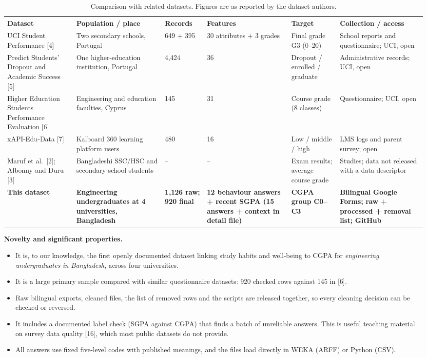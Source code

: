 \documentclass[11pt,a4paper]{article}
\newcommand{\hd}[1]{\textbf{#1}}
\begin{document}
\begin{table}[!htbp]
\centering\footnotesize
\caption{Comparison with related datasets. Figures are as reported by the dataset authors.}
\label{tab:compare}
\begin{tabularx}{\linewidth}{|L{30mm}|L{30mm}|R{12mm}|L{22mm}|Y|L{22mm}|}
\hline
{}\hd{Dataset} & \hd{Population / place} & \hd{Records} & \hd{Features} & \hd{Target} & \hd{Collection / access} \\ \hline
UCI Student Performance [4] & Two secondary schools, Portugal & 649 + 395 & 30 attributes + 3 grades & Final grade G3 (0--20) & School reports and questionnaire; UCI, open \\ \hline
Predict Students' Dropout and Academic Success [5] & One higher-education institution, Portugal & 4,424 & 36 & Dropout / enrolled / graduate & Administrative records; UCI, open \\ \hline
Higher Education Students Performance Evaluation [6] & Engineering and education faculties, Cyprus & 145 & 31 & Course grade (8 classes) & Questionnaire; UCI, open \\ \hline
xAPI-Edu-Data [7] & Kalboard 360 learning platform users & 480 & 16 & Low / middle / high & LMS logs and parent survey; open \\ \hline
Maruf et al.\ [2]; Albonny and Duru [3] & Bangladeshi SSC/HSC and secondary-school students & -- & -- & Exam results; average course grade & Studies; data not released with a data descriptor \\ \hline
\textbf{This dataset} & \textbf{Engineering undergraduates at 4 universities, Bangladesh} & \textbf{1,126 raw; 920 final} & \textbf{12 behaviour answers + recent SGPA (15 answers + context in detail file)} & \textbf{CGPA group C0--C3} & \textbf{Bilingual Google Forms; raw + processed + removal list; GitHub} \\ \hline
\end{tabularx}
\end{table}

\textbf{Novelty and significant properties.}
\begin{itemize}
\item It is, to our knowledge, the first openly documented dataset linking study habits and well-being to CGPA for \emph{engineering undergraduates in Bangladesh}, across four universities.
\item It is a large primary sample compared with similar questionnaire datasets: 920 checked rows against 145 in [6].
\item Raw bilingual exports, cleaned files, the list of removed rows and the scripts are released together, so every cleaning decision can be checked or reversed.
\item It includes a documented label check (SGPA against CGPA) that finds a batch of unreliable answers. This is useful teaching material on survey data quality [16], which most public datasets do not provide.
\item All answers use fixed five-level codes with published meanings, and the files load directly in WEKA (ARFF) or Python (CSV).
\end{itemize}
\end{document}
